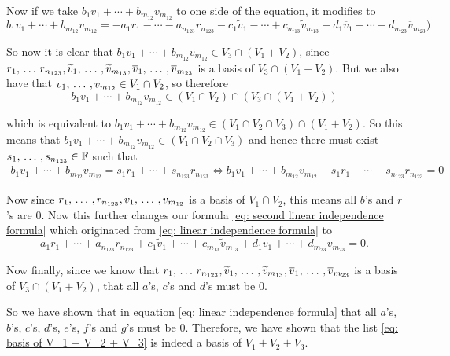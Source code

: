 \begin{xrcs}
Now if we take $b_1v_1 +  \cdots + b_{m_{12}} v_{m_{12}}$ to one side of the equation, it modifies to
\[
b_1v_1 +  \cdots + b_{m_{12}} v_{m_{12}} = -a_1r_1 -  \cdots - a_{n_{123}} r_{n_{123}} -   c_1\widetilde{v}_1 - \cdots + c_{m_{13}}\widetilde{v}_{m_{13}} - d_{1}\overline{v}_1 - \cdots - d_{m_{23}}\overline{v}_{m_{23}} )
\]

So now it is clear that $b_1v_1 +  \cdots + b_{m_{12}} v_{m_{12}} \in V_3 \cap (V_1+V_2)$, since $r_1,  {\, \ldots \,\,} r_{n_{123}} ,  \widetilde{v}_1, {\, \ldots \,\,}, \widetilde{v}_{m_{13}}, \overline{v}_1, {\, \ldots \,\,}, \overline{v}_{m_{23}}$ is a basis of $V_3 \cap (V_1+V_2)$. But we also have that $v_1, {\, \ldots \,\,}, v_{m_{12}} \in V_1 \cap V_2$, so therefore
\[
  b_1v_1 +  \cdots + b_{m_{12}} v_{m_{12}} \in (V_1 \cap V_2) \cap (V_3 \cap (V_1+V_2))
\]

which is equivalent to
$
    b_1v_1 +  \cdots + b_{m_{12}} v_{m_{12}} \in (V_1 \cap V_2 \cap V_3) \cap (V_1+V_2).
$
So this means that $b_1v_1 +  \cdots + b_{m_{12}} v_{m_{12}} \in (V_1 \cap V_2 \cap V_3)$ and hence there must exist $s_1, {\, \ldots \,\,}, s_{n_{123}} \in \mathbb{F}$ such that
\begin{equation}
  \begin{aligned}
    b_1v_1 +  \cdots + b_{m_{12}} v_{m_{12}} = s_1 r_1 + \cdots + s_{n_{123}} r_{n_{123}} \iff
    b_1v_1 +  \cdots + b_{m_{12}} v_{m_{12}} - s_1 r_1 - \cdots - s_{n_{123}} r_{n_{123}} = 0
  \end{aligned}
\end{equation}

Now since $r_1, {\, \ldots \,\,}, r_{n_{123}}, v_1, {\, \ldots \,\,}, v_{m_{12}}$ is a basis of $V_1 \cap V_2$, this means all $b$'s and $r$'s are $0$. Now this further changes our formula \eqref{eq: second linear independence formula} which originated from \eqref{eq: linear independence formula} to
\begin{equation}
  a_1r_1 +  \cdots + a_{n_{123}} r_{n_{123}} + c_1\widetilde{v}_1 + \cdots + c_{m_{13}}\widetilde{v}_{m_{13}} + d_{1}\overline{v}_1 + \cdots + d_{m_{23}}\overline{v}_{m_{23}} = 0.
\end{equation}

Now finally, since we know that $r_1,  {\, \ldots \,\,} r_{n_{123}} ,  \widetilde{v}_1, {\, \ldots \,\,}, \widetilde{v}_{m_{13}}, \overline{v}_1, {\, \ldots \,\,}, \overline{v}_{m_{23}}$ is a basis of $V_3 \cap (V_1 + V_2)$, that all $a$'s, $c$'s and $d$'s must be $0$.

So we have shown that in equation \eqref{eq: linear independence formula} that all $a$'s, $b$'s, $c$'s, $d$'s, $e$'s, $f$'s and $g$'s must be $0$. Therefore, we have shown that the list \eqref{eq: basis of V_1 + V_2 + V_3} is indeed a basis of $V_1 + V_2 + V_3$.
\end{xrcs}